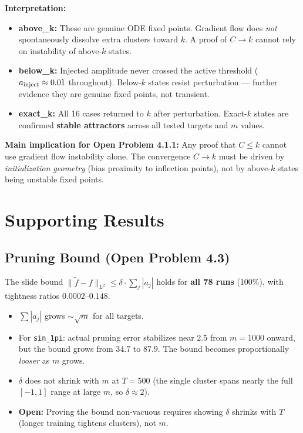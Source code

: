 \documentclass[11pt, letterpaper]{article}
\begin{document}
\vspace{2pt}
\textbf{Interpretation:}
\begin{itemize}[leftmargin=1.4em, itemsep=0pt]
  \item \textbf{above\_k:} These are genuine ODE fixed points. Gradient flow does \emph{not}
        spontaneously dissolve extra clusters toward $k$. A proof of $C\to k$ cannot rely on
        instability of above-$k$ states.
  \item \textbf{below\_k:} Injected amplitude never crossed the active threshold
        ($a_{\rm inject}\approx 0.01$ throughout). Below-$k$ states resist perturbation --- further
        evidence they are genuine fixed points, not transient.
  \item \textbf{exact\_k:} All 16 cases returned to $k$ after perturbation. Exact-$k$ states
        are confirmed \textbf{stable attractors} across all tested targets and $m$ values.
\end{itemize}

\textbf{Main implication for Open Problem 4.1.1:} Any proof that $C\leq k$ cannot use
gradient flow instability alone. The convergence $C\to k$ must be driven by
\emph{initialization geometry} (bias proximity to inflection points), not by above-$k$
states being unstable fixed points.

\section*{Supporting Results}

\subsection*{Pruning Bound (Open Problem 4.3)}

The slide bound $\|\tilde{f}-f\|_{L^2}\leq\delta\cdot\sum_j|a_j|$ holds for \textbf{all 78 runs}
(100\%), with tightness ratios $0.0002$--$0.148$.

\begin{itemize}[leftmargin=1.4em, itemsep=0pt]
  \item $\sum|a_j|$ grows $\sim\sqrt{m}$ for all targets.
  \item For \texttt{sin\_1pi}: actual pruning error stabilizes near $2.5$ from $m=1000$
        onward, but the bound grows from $34.7$ to $87.9$. The bound becomes proportionally
        \emph{looser} as $m$ grows.
  \item $\delta$ does not shrink with $m$ at $T=500$ (the single cluster spans nearly the full
        $[-1,1]$ range at large $m$, so $\delta\approx 2$).
  \item \textbf{Open:} Proving the bound non-vacuous requires showing $\delta$ shrinks with
        $T$ (longer training tightens clusters), not $m$.
\end{itemize}
\end{document}
